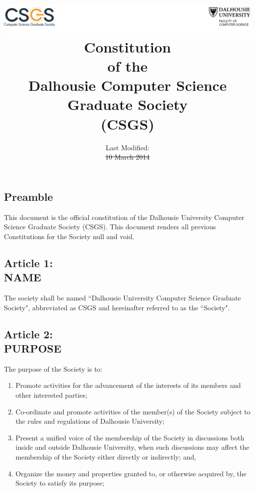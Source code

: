 \documentclass[]{report}
\title{
	\includegraphics[width=1.00\columnwidth]{header}\\
	\vspace{3.0 in}
	Constitution\\of the\\Dalhousie Computer Science Graduate Society\\(CSGS)
}
\author{ }
\date{Last Modified:\\\st{10 March 2014}\\\color{red}{13 March 2015}}
\begin{document}
\maketitle

\clearpage
\begin{center}
	\section*{Preamble}
	\vspace{12px}
\end{center}
\label{preamble}
	This document is the official constitution of the Dalhousie University Computer Science Graduate Society (CSGS). This document renders all previous Constitutions for the Society null and void.


\clearpage
\color{red}{
	\tableofcontents
}
\color{black}

\clearpage
\begin{center}
	\section*{Article 1:\\NAME}
	\vspace{12px}
\end{center}
\label{name}
	The society shall be named ``Dalhousie University Computer Science Graduate Society", abbreviated as CSGS and hereinafter referred to as the ``Society".


\clearpage
\begin{center}
	\section*{Article 2:\\PURPOSE}
	\vspace{12px}
\end{center}
\label{purpose}

	The purpose of the Society is to:\\
	
	\renewcommand{\theenumi}{\Alph{enumi}}
	\begin{enumerate}
	
		\item Promote activities for the advancement of the interests of its members and other interested parties;
		
		\item Co-ordinate and promote activities of the member(s) of the Society subject to the rules and regulations of Dalhousie University;
		
		\item Present a unified voice of the membership of the Society in discussions both inside and outside Dalhousie University, when such discussions may affect the membership of the Society either directly or indirectly; and,
		
		\item Organize the money and properties granted to, or otherwise acquired by, the Society to satisfy its purpose;

	\end{enumerate}
\end{document}
